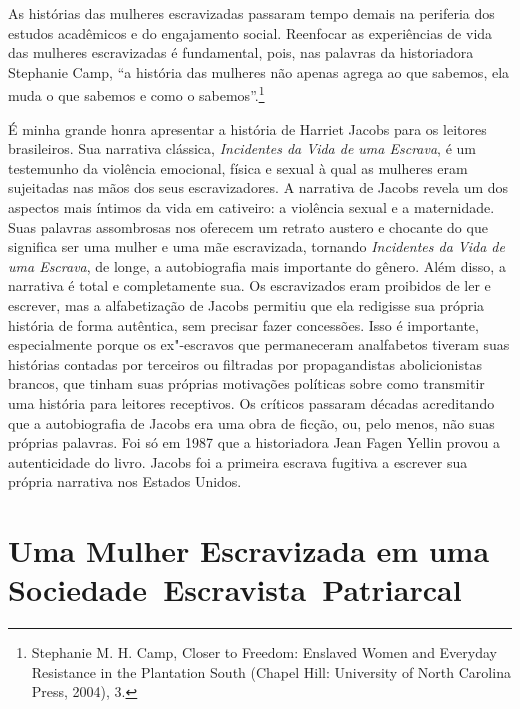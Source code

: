 As histórias das mulheres escravizadas
passaram tempo demais na periferia dos estudos acadêmicos e do
engajamento social. Reenfocar as experiências de vida das
mulheres escravizadas é fundamental, pois, nas palavras da historiadora
Stephanie Camp, ``a história das mulheres não apenas agrega ao que
sabemos, ela muda o que sabemos e como o sabemos''.\footnote{Stephanie
  M. H. Camp, Closer to Freedom: Enslaved Women and Everyday Resistance
  in the Plantation South (Chapel Hill: University of North Carolina
  Press, 2004), 3.}

É minha grande honra apresentar a história de Harriet Jacobs para os
leitores brasileiros. Sua narrativa clássica, \emph{Incidentes da Vida
de uma Escrava}, é um testemunho da violência emocional, física e sexual
à qual as mulheres eram sujeitadas nas mãos dos seus escravizadores. A
narrativa de Jacobs revela um dos aspectos mais íntimos da vida em
cativeiro: a violência sexual e a maternidade. Suas palavras assombrosas
nos oferecem um retrato austero e chocante do que significa ser uma
mulher e uma mãe escravizada, tornando \emph{Incidentes da Vida de uma Escrava},
de longe, a autobiografia mais importante do gênero. Além disso, a
narrativa é total e completamente sua. Os escravizados eram proibidos de
ler e escrever, mas a alfabetização de Jacobs permitiu que ela
redigisse sua própria história de forma autêntica, sem precisar fazer
concessões. Isso é importante, especialmente porque os ex"-escravos que
permaneceram analfabetos tiveram suas histórias contadas por terceiros
ou filtradas por propagandistas abolicionistas brancos, que tinham suas
próprias motivações políticas sobre como transmitir uma história para
leitores receptivos. Os críticos passaram décadas acreditando que a
autobiografia de Jacobs era uma obra de ficção, ou, pelo menos, não suas
próprias palavras. Foi só em 1987 que a historiadora Jean Fagen Yellin
provou a autenticidade do livro. Jacobs foi a primeira escrava fugitiva
a escrever sua própria narrativa nos Estados Unidos.

\section{Uma Mulher Escravizada em uma Sociedade~Escravista~Patriarcal}

